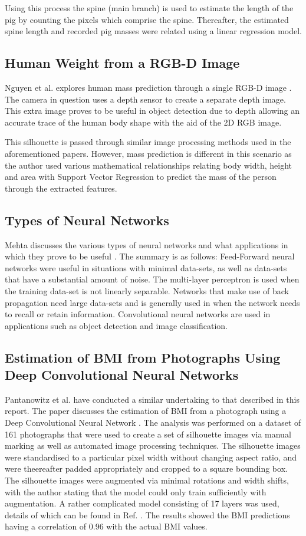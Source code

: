 \documentclass[conference]{IEEEtran}
\begin{document}
Using this process the spine (main branch) is used to estimate the length of the pig by counting the pixels which comprise the spine.
Thereafter, the estimated spine length and recorded pig masses were related using a linear regression model.

\subsection{Human Weight from a RGB-D Image}
Nguyen et al. explores human mass prediction through a single RGB-D image \cite{nguyen2014seeing}.
The camera in question uses a depth sensor to create a separate depth image. 
This extra image proves to be useful in object detection due to depth allowing an accurate trace of the human body shape with the aid of the 2D RGB image. 

This silhouette is passed through similar image processing methods used in the aforementioned papers. 
However, mass prediction is different in this scenario as the author used various mathematical relationships relating body width, height and area with Support Vector Regression to predict the mass of the person through the extracted features.

\subsection{Types of Neural Networks}
Mehta discusses the various types of neural networks and what applications in which they prove to be useful \cite{mehta_2019}. 
The summary is as follows:
Feed-Forward neural networks were useful in situations with minimal data-sets, as well as data-sets that have a substantial amount of noise.
The multi-layer perceptron is used when the training data-set is not linearly separable.
Networks that make use of back propagation need large data-sets and is generally used in when the network needs to recall or retain information.
Convolutional neural networks are used in applications such as object detection and image classification.

\subsection{Estimation of BMI from Photographs Using Deep Convolutional Neural Networks}
Pantanowitz et al. have conducted a similar undertaking to that described in this report.
The paper discusses the estimation of BMI from a photograph using a Deep Convolutional Neural Network \cite{bmifromphoto}.
The analysis was performed on a dataset of 161 photographs that were used to create a set of silhouette images via manual marking as well as automated image processing techniques.
The silhouette images were standardised to a particular pixel width without changing aspect ratio, and were theereafter padded appropriately and cropped to a square bounding box.
The silhouette images were augmented via minimal rotations and width shifts, with the author stating that the model could only train sufficiently with augmentation.
A rather complicated model consisting of 17 layers was used, details of which can be found in Ref. \cite{bmifromphoto}.
The results showed the BMI predictions having a correlation of 0.96 with the actual BMI values.
\end{document}

